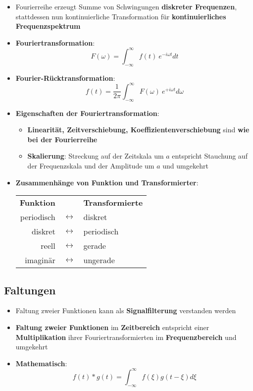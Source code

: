 \begin{itemize}
	\item Fourierreihe erzeugt Summe von Schwingungen \textbf{diskreter Frequenzen}, stattdessen nun kontinuierliche Transformation für \textbf{kontinuierliches Frequenzspektrum}
	\item \textbf{Fouriertransformation}:
	$$F(\omega) = \int^\infty_{-\infty}f(t)\ e^{-i\omega t}dt$$
	\item \textbf{Fourier-Rücktransformation}:
	$$f(t) = \frac{1}{2\pi}\int^\infty_{-\infty}F(\omega)\ e^{+i\omega t}d\omega$$
	\item \textbf{Eigenschaften der Fouriertransformation}:
	\begin{itemize}
		\item \textbf{Linearität, Zeitverschiebung, Koeffizientenverschiebung} sind \textbf{wie bei der Fourierreihe}
		\item \textbf{Skalierung}: Streckung auf der Zeitskala um $a$ entspricht Stauchung auf der Frequenzskala und der Amplitude um $a$ und umgekehrt
	\end{itemize}
	\item \textbf{Zusammenhänge von Funktion und Transformierter}:
	\begin{center}
		\begin{tabular}{r c l}
			\textbf{Funktion} 	& 					& \textbf{Transformierte}\\
			periodisch 			& $\leftrightarrow$ & diskret\\
			diskret 			& $\leftrightarrow$ & periodisch\\
			reell 				& $\leftrightarrow$ & gerade\\
			imaginär 			& $\leftrightarrow$ & ungerade
		\end{tabular}
	\end{center}
\end{itemize}

\subsection{Faltungen}%
\label{four:sub:faltungen}

\begin{itemize}
	\item Faltung zweier Funktionen kann als \textbf{Signalfilterung} verstanden werden
	\item \textbf{Faltung zweier Funktionen} im \textbf{Zeitbereich} entspricht einer \textbf{Multiplikation} ihrer Fouriertransformierten im \textbf{Frequenzbereich} und umgekehrt
	\item \textbf{Mathematisch}: $$f(t) * g(t) = \int^\infty_{-\infty}f(\xi)g(t - \xi)d\xi$$
\end{itemize}

